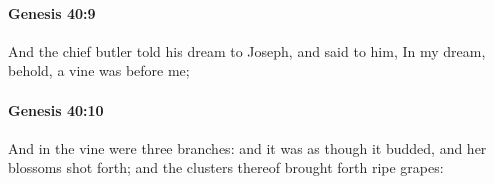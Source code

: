 		\paragraph{Genesis 40:9} %
			\label{GENESIS-40-9}

			And the chief butler told his dream to Joseph, and said to him, In my dream, behold, a vine was before me;


		\paragraph{Genesis 40:10} %
			\label{GENESIS-40-10}

			And in the vine were three branches: and it was as though it budded, and her blossoms shot forth; and the clusters thereof brought forth ripe grapes:


